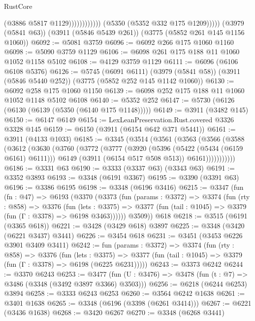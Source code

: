 \begin{lexlean}{RustCore}
\begin{coremodule}
                                (@3886 @5817 @1129))))))))))))
          (@5350 (@5352 @332 @175 @1209)))))
    (@3979 (@5841 @63))
    (@3911 (@5846 @5439 @261))
    (@3775 (@5852 @261 @145 @1156 @1060))
@6092 := @5081 @3759
@6096 := @6092 @266 @175 @1060 @1160
@6098 := @5090 @3759 @1129
@6106 := @6098 @261 @175 @188 @11 @1060 @1052 @1158 @5102
@6108 := @4129 @3759 @1129
@6111 := @6096 (@6106 @6108 @5376)
@6126 := @5745
    (@6091 @6111)
    (@3979 (@5841 @58))
    (@3911 (@5846 @5440 @252))
    (@3775 (@5852 @252 @145 @1142 @1060))
@6130 := @6092 @258 @175 @1060 @1150
@6139 := @6098 @252 @175 @188 @11 @1060 @1052 @1148 @5102 @6108
@6140 := @5352 @252
@6147 := @5730 (@6126 (@6130 (@6139 (@5350 (@6140 @175 @1148)))))
@6149 := @3911 (@3482 @145)
@6150 := @6147 @6149
@6154 := LexLeanPreservation.Rust.covered @3326 @3328 @145
@6159 := @6150 (@3911 (@6154 @642 @371 @5441))
@6161 := @3911 (@4133 @1033)
@6185 := @3345
    (@3514
      (@3561
        (@3563
          (@3566
            (@3588
              (@3612
                (@3630
                  (@3760
                    (@3772
                      (@3777
                        (@3920
                          (@5396 (@5422 (@5434 (@6159 @6161) @6111)))
                          @6149
                          (@3911 (@6154 @517 @508 @513))
                          @6161)))))))))))
@6186 := @3331 @63
@6190 := @3333 (@3337 @63) (@3343 @63)
@6191 := @3352 @3893
@6193 := @3348 (@6191 @3367)
@6195 := @3390 (@3391 @63)
@6196 := @3386 @6195
@6198 := @3348 (@6196 @3416)
@6215 := @3347
    (fun (fn : @47) =>
    @6193
      (@3370
        (@3373
          (fun (params : @3372) =>
          @3374
            (fun (rty : @858) =>
            @3376
              (fun (lets : @3375) =>
              @3377 (fun (tail : @1045) => @3379 (fun (Γ : @3378) => @6198 @3463))))))
        @3509))
    @618
@6218 := @3515 (@6191 (@3365 @618))
@6221 := @3428 (@3429 @618) @3897
@6225 := @3348 (@3420 (@6221 @3437) @3441)
@6226 := @3454 @618
@6231 := @3451 (@3453 @6226 @3901 @3409 @3411)
@6242 := fun (params : @3372) =>
  @3374
    (fun (rty : @858) =>
    @3376
      (fun (lets : @3375) =>
      @3377 (fun (tail : @1045) => @3379 (fun (Γ : @3378) => @6198 (@6225 @6231)))))
@6243 := @3373 @6242
@6244 := @3370 @6243
@6253 := @3477 (fun (U : @3476) => @3478 (fun (t : @7) => @3486 (@3348 (@3492 @3897 @3366) @3503)))
@6256 := @6218 (@6244 @6253) @3894
@6258 := @3333 @6243 @6253
@6260 := @3564 @6242 @1638
@6261 := @3401 @1638
@6265 := @3348 (@6196 (@3398 (@6261 @3414)))
@6267 := @6221 (@3436 @1638)
@6268 := @3420 @6267
@6270 := @3348 (@6268 @3441)

\end{coremodule}
\end{lexlean}
